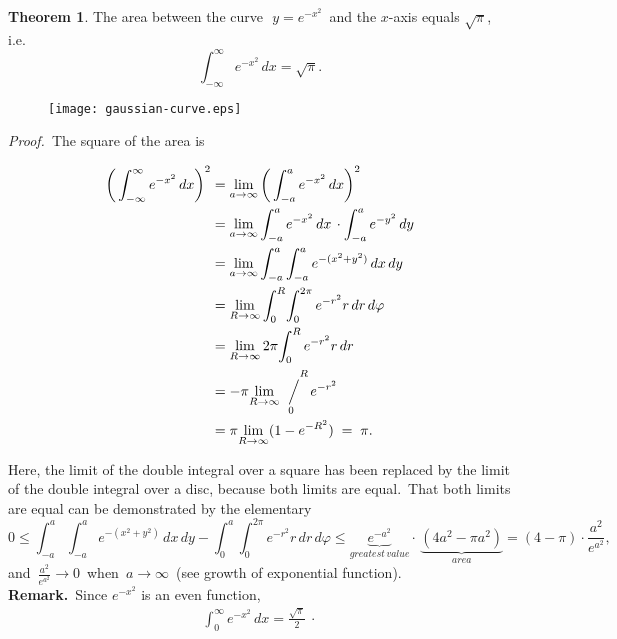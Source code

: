 \documentclass[12pt]{article}
\newcommand{\sijoitus}[2]%
{\operatornamewithlimits{\Big/}_{\!\!\!#1}^{\,#2}}
\theoremstyle{definition}
\newtheorem*{thmplain}{Theorem}
\begin{document}
\begin{thmplain}
The area between the curve\,\, $y = e^{-x^2}$\, and the $x$-axis equals $\sqrt{\pi}$,\, i.e.
    $$\int_{-\infty}^\infty e^{-x^2}\,dx = \sqrt{\pi}.$$
\end{thmplain}

\begin{figure}[!htb]
\begin{center}
\texttt{[image: gaussian-curve.eps]}
\end{center}
\end{figure}

{\em Proof.}\, The square of the area is

\begin{align*}
\bigg(\int_{-\infty}^\infty e^{-x^2}\,dx\bigg)^2 
& = \lim_{a\to\infty}\bigg(\int_{-a}^a e^{-x^2}\,dx\bigg)^2\\ 
& = \lim_{a\to\infty}\int_{-a}^a e^{-x^2}\,dx\,\cdot\int_{-a}^a e^{-y^2}\,dy\\
& = \lim_{a\to\infty}\int_{-a}^a \int_{-a}^a e^{-(x^2+y^2)}\,dx\,dy\\
& = \lim_{R\to\infty}\int_0^R\!\int_0^{2\pi}e^{-r^2}r\,dr\,d\varphi\\
& = \lim_{R\to\infty}2\pi\!\int_0^R e^{-r^2}r\,dr\\
& = -\pi\!\lim_{R\to\infty}\!\sijoitus{0}{\quad\,\,R}e^{-r^2}\\
& = \pi\!\lim_{R\to\infty}(1-e^{-R^2}) \;=\; \pi.
\end{align*}

Here, the limit of the double integral over a square has been replaced by the limit of the double integral over a disc, because both limits are equal.\, That both limits are equal can be demonstrated by the elementary 
$$0 \leq \int_{-a}^a \int_{-a}^a\!e^{-(x^2 + y^2)}\,dx\,dy
- \int_0^a\!\int_0^{2\pi}\!e^{-r^2} r\,dr\,d\varphi
\leq \underbrace{e^{-a^2}}_{greatest\,value}\!\cdot\,\underbrace{(4a^2\!-\!\pi a^2)}_{area}
= (4\!-\!\pi)\!\cdot\!\frac{a^2}{e^{a^2}},$$
and\, $\frac{a^2}{e^{a^2}} \to 0$\, when\, $a \to \infty$\, (see growth of exponential function).\\

\textbf{Remark.}\, Since $e^{-x^2}$ is an even function,
\begin{align*}
\int_0^\infty e^{-x^2}\,dx=\frac{\sqrt{\pi}}{2}\:\cdot
\end{align*}
\end{document}
